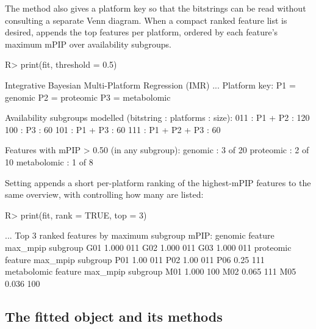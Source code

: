 \documentclass[article]{jss}
\begin{document}
The  method also gives a platform key so that the bitstrings
can be read without consulting a separate Venn diagram.  When a compact ranked
feature list is desired,  appends the
top features per platform, ordered by each feature's maximum mPIP over
availability subgroups.

\begin{CodeChunk}
\begin{CodeInput}
R> print(fit, threshold = 0.5)
\end{CodeInput}
\begin{CodeOutput}
Integrative Bayesian Multi-Platform Regression (IMR)
...
Platform key:
  P1 = genomic
  P2 = proteomic
  P3 = metabolomic

Availability subgroups modelled (bitstring : platforms : size):
  011 : P1 + P2      : 120
  100 : P3           : 60
  101 : P1 + P3      : 60
  111 : P1 + P2 + P3 : 60

Features with mPIP > 0.50 (in any subgroup):
  genomic      : 3 of 20
  proteomic    : 2 of 10
  metabolomic  : 1 of 8
\end{CodeOutput}
\end{CodeChunk}

Setting  appends a short per-platform ranking of the
highest-mPIP features to the same overview, with  controlling how many
are listed:

\begin{CodeChunk}
\begin{CodeInput}
R> print(fit, rank = TRUE, top = 3)
\end{CodeInput}
\begin{CodeOutput}
...
Top 3 ranked features by maximum subgroup mPIP:
  genomic
     feature max_mpip subgroup
         G01    1.000      011
         G02    1.000      011
         G03    1.000      011
  proteomic
     feature max_mpip subgroup
         P01     1.00      011
         P02     1.00      011
         P06     0.25      111
  metabolomic
     feature max_mpip subgroup
         M01    1.000      100
         M02    0.065      111
         M05    0.036      100
\end{CodeOutput}
\end{CodeChunk}

\subsection{The fitted object and its methods}\label{sec:methods}
\end{document}
